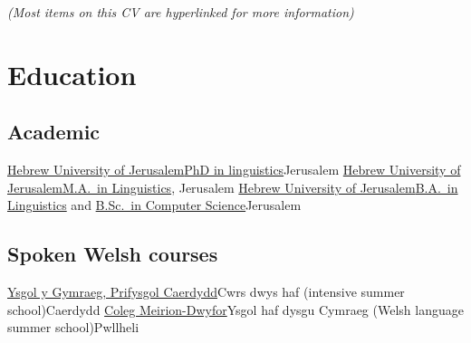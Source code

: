 



\newcommand{\cvdate}{\the\year-\the\month-\the\day}
\fancyfoot[l]{\color{color2}[\cvdate]}



\makecvtitle

\begin{center}
	\vspace{-2\baselineskip}
	\color{color2}\footnotesize{}\textit{(Most items on this CV are hyperlinked for more information)}
\end{center}
	


\section{Education}

\subsection{Academic}

{\href{https://huji.ac.il}{Hebrew University of Jerusalem}}{\href{https://en.linguistics.huji.ac.il/book/phd-candidates}{PhD in linguistics}}{Jerusalem}{}{}%
{\href{https://huji.ac.il}{Hebrew University of Jerusalem}}{\href{https://en.linguistics.huji.ac.il/book/ma-degree}{M.A.\ in Linguistics}, }{Jerusalem}{}{}%
{\href{https://huji.ac.il}{Hebrew University of Jerusalem}}{\href{https://en.linguistics.huji.ac.il/book/ba-degree}{B.A.\ in Linguistics} and \href{https://cs.huji.ac.il/academics/programs-for-bachelors-degree}{B.Sc.\ in Computer Science}}{Jerusalem}{}{}%



\subsection{Spoken Welsh courses}

{\href{https://cardiff.ac.uk/cy/welsh}{Ysgol y Gymraeg, Prifysgol Caerdydd}}{Cwrs dwys haf (intensive summer school)}{Caerdydd}{}{}
{\href{https://gllm.ac.uk/cy/locations/pwllheli}{Coleg Meirion-Dwyfor}}{Ysgol haf dysgu Cymraeg (Welsh language summer school)}{Pwllheli}{}{}





